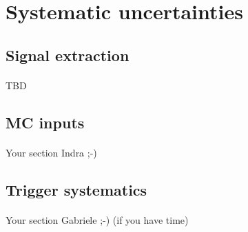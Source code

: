 \graphicspath{{Figures/Section4/}}

\section{\label{syst}Systematic uncertainties}

\subsection{\label{systSig}Signal extraction}

\paragraph{}
TBD

\subsection{\label{systMC}MC inputs}

\paragraph{}
Your section Indra ;-)



\subsection{\label{systTrigger}Trigger systematics}

\paragraph{}
Your section Gabriele ;-)  (if you have time)
